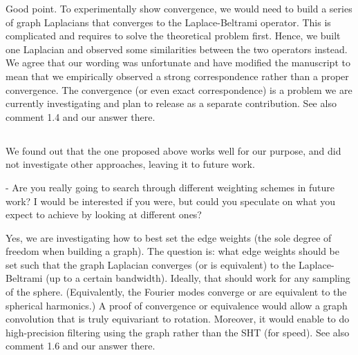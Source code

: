\documentclass[12pt,a4paper]{article}
\newcommand{\nati}[1]{{\color[rgb]{.1,.6,.1}{NP: #1}}}
\newcommand{\mdeff}[1]{{\color[rgb]{.1,.6,.1}{MD: #1}}}
\newcommand{\todo}[1]{{\color[rgb]{.6,.1,.6}{TODO: #1}}}
\newcommand{\1}{\b{1}}              %
\newcommand{\0}{\b{0}}              %
\begin{document}
Good point.
To experimentally show convergence, we would need to build a series of graph Laplacians that converges to the Laplace-Beltrami operator.
This is complicated and requires to solve the theoretical problem first.
Hence, we built one Laplacian and observed some similarities between the two operators instead.
We agree that our wording was unfortunate and have modified the manuscript to mean that we empirically observed a strong correspondence rather than a proper convergence.
The convergence (or even exact correspondence) is a problem we are currently investigating and plan to release as a separate contribution.
See also comment 1.4 and our answer there.

\todo{the new figure A.12 is maybe a weak proof of convergence}

\mdeff{@nati, what do you think?}


\subsection{}

\begin{mdframed}[style=comment]
We found out that the one proposed above works well for our purpose, and did not investigate other approaches, leaving it to future work.

- Are you really going to search through different weighting schemes in future work? I would be interested if you were, but could you speculate on what you expect to achieve by looking at different ones?
\end{mdframed}

Yes, we are investigating how to best set the edge weights (the sole degree of freedom when building a graph).
The question is: what edge weights should be set such that the graph Laplacian converges (or is equivalent) to the Laplace-Beltrami (up to a certain bandwidth).
Ideally, that should work for any sampling of the sphere.
(Equivalently, the Fourier modes converge or are equivalent to the spherical harmonics.)
A proof of convergence or equivalence would allow a graph convolution that is truly equivariant to rotation.
Moreover, it would enable to do high-precision filtering using the graph rather than the SHT (for speed).
See also comment 1.6 and our answer there.

\end{document}
